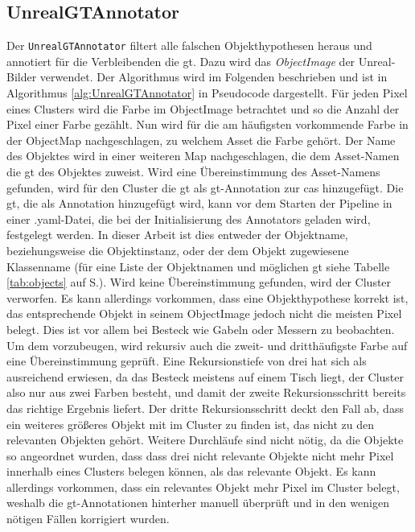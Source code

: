\subsection{UnrealGTAnnotator}
Der \texttt{UnrealGTAnnotator} filtert alle falschen Objekthypothesen heraus und annotiert für die Verbleibenden die \gls{gt}. Dazu wird das \textit{ObjectImage} der Unreal-Bilder verwendet. Der Algorithmus wird im Folgenden beschrieben und ist in Algorithmus \ref{alg:UnrealGTAnnotator} in Pseudocode dargestellt.\newline
Für jeden Pixel eines Clusters wird die Farbe im ObjectImage betrachtet und so die Anzahl der Pixel einer Farbe gezählt. Nun wird für die am häufigsten vorkommende Farbe in der ObjectMap nachgeschlagen, zu welchem Asset die Farbe gehört. Der Name des Objektes wird in einer weiteren Map nachgeschlagen, die dem Asset-Namen die \gls{gt} des Objektes zuweist. Wird eine Übereinstimmung des Asset-Namens gefunden, wird für den Cluster die \gls{gt} als \gls{gt}-Annotation zur \gls{cas} hinzugefügt. Die \gls{gt}, die als Annotation hinzugefügt wird, kann vor dem Starten der Pipeline in einer .yaml-Datei, die bei der Initialisierung des Annotators geladen wird, festgelegt werden. In dieser Arbeit ist dies entweder der Objektname, beziehungsweise die Objektinstanz, oder der dem Objekt zugewiesene Klassenname (für eine Liste der Objektnamen und möglichen \gls{gt} siehe Tabelle \ref{tab:objects} auf S.\pageref{tab:objects}). Wird keine Übereinstimmung gefunden, wird der Cluster verworfen. Es kann allerdings vorkommen, dass eine Objekthypothese korrekt ist, das entsprechende Objekt in seinem ObjectImage jedoch nicht die meisten Pixel belegt. Dies ist vor allem bei Besteck wie Gabeln oder Messern zu beobachten. Um dem vorzubeugen, wird rekursiv auch die zweit- und dritthäufigste Farbe auf eine Übereinstimmung geprüft. Eine Rekursionstiefe von drei hat sich als ausreichend erwiesen, da das Besteck meistens auf einem Tisch liegt, der Cluster also nur aus zwei Farben besteht, und damit der zweite Rekursionsschritt bereits das richtige Ergebnis liefert. Der dritte Rekursionsschritt deckt den Fall ab, dass ein weiteres größeres Objekt mit im Cluster zu finden ist, das nicht zu den relevanten Objekten gehört. Weitere Durchläufe sind nicht nötig, da die Objekte so angeordnet wurden, dass dass drei nicht relevante Objekte nicht mehr Pixel innerhalb eines Clusters belegen können, als das relevante Objekt. Es kann allerdings vorkommen, dass ein relevantes Objekt mehr Pixel im Cluster belegt, weshalb die \gls{gt}-Annotationen hinterher manuell überprüft und in den wenigen nötigen Fällen korrigiert wurden.

